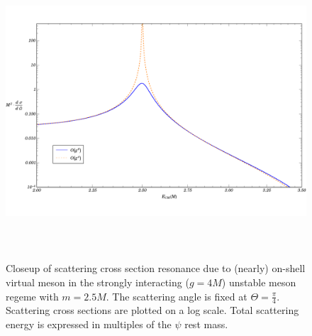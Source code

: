 \documentclass{article}
\begin{document}
\begin{figure}
\begin{center}
\includegraphics[width=15cm, height=11cm]{Resonance-Illustration}
\caption{Closeup of scattering cross section resonance due to (nearly) on-shell virtual meson in the strongly interacting ($g = 4 M$) unstable meson regeme with $m = 2.5 M$. The scattering angle is fixed at $\Theta = \frac{\pi}{4}$. Scattering cross sections are plotted on a log scale. Total scattering energy is expressed in multiples of the $\psi$ rest mass.} 
\label{IllResonance}
\end{center}
\end{figure}
\end{document}
